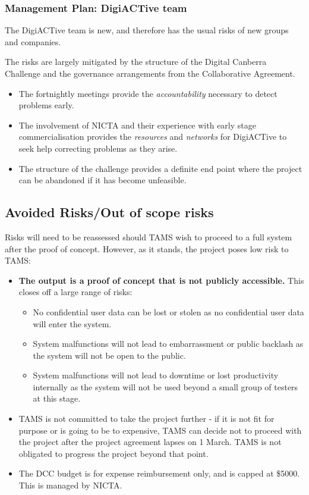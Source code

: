 \documentclass[12pt,a4paper,twosided]{article}
\begin{document}
\subsubsection{Management Plan: DigiACTive team}

The DigiACTive team is new, and therefore has the usual risks of new
groups and companies.

The risks are largely mitigated by the structure of the Digital Canberra
Challenge and the governance arrangements from the Collaborative
Agreement.

\begin{itemize}
\itemsep1pt\parskip0pt
\item
  The fortnightly meetings provide the \emph{accountability} necessary
  to detect problems early.
\item
  The involvement of NICTA and their experience with early stage
  commercialisation provides the \emph{resources} and \emph{networks}
  for DigiACTive to seek help correcting problems as they arise.
\item
  The structure of the challenge provides a definite end point where the
  project can be abandoned if it has become unfeasible.
\end{itemize}

\subsection{Avoided Risks/Out of scope risks}

Risks will need to be reassessed should TAMS wish to proceed to a full
system after the proof of concept. However, as it stands, the project
poses low risk to TAMS:

\begin{itemize}
\itemsep1pt\parskip0pt
\item
  \textbf{The output is a proof of concept that is not publicly
  accessible.} This closes off a large range of risks:

  \begin{itemize}
  \itemsep1pt\parskip0pt
  \item
    No confidential user data can be lost or stolen as no confidential
    user data will enter the system.
  \item
    System malfunctions will not lead to embarrassment or public
    backlash as the system will not be open to the public.
  \item
    System malfunctions will not lead to downtime or lost productivity
    internally as the system will not be used beyond a small group of
    testers at this stage.
  \end{itemize}
\item
  TAMS is not committed to take the project further - if it is not fit
  for purpose or is going to be to expensive, TAMS can decide not to
  proceed with the project after the project agreement lapses on 1
  March. TAMS is not obligated to progress the project beyond that
  point.
\item
  The DCC budget is for expense reimbursement only, and is capped at
  \$5000. This is managed by NICTA.
\end{itemize}
\end{document}

